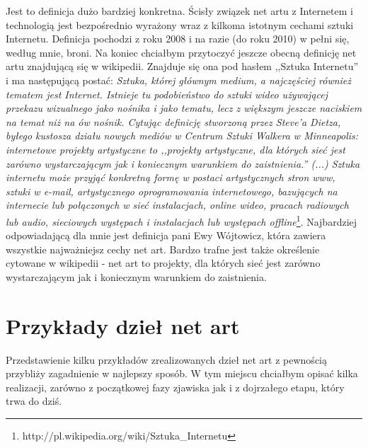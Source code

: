 \documentclass[a4paper,12pt,twoside]{article}
\begin{document}
Jest to definicja dużo bardziej konkretna. Ścisły związek net artu
z Internetem i technologią jest bezpośrednio wyrażony wraz z kilkoma
istotnym cechami sztuki Internetu. Definicja pochodzi z roku 2008
i na razie (do roku 2010) w pełni się, według mnie, broni.
Na koniec chciałbym przytoczyć jeszcze obecną definicję net artu znajdującą
się w wikipedii. Znajduje się ona pod hasłem ,,Sztuka Internetu'' i ma
następującą postać: %
\textit{Sztuka, której głównym
medium, a najczęściej również tematem jest Internet. Istnieje tu podobieństwo
do sztuki wideo używającej przekazu wizualnego jako nośnika i jako tematu,
lecz z większym jeszcze naciskiem na temat niż na ów nośnik. Cytując definicję
stworzoną przez Steve'a Dietza, byłego kustosza działu nowych mediów
w Centrum Sztuki Walkera w Minneapolis: internetowe projekty artystyczne
to ,,projekty artystyczne, dla których sieć jest zarówno wystarczającym
jak i koniecznym warunkiem do zaistnienia.'' (...) Sztuka internetu może
przyjąć konkretną formę w postaci artystycznych stron www, sztuki w e-mail,
artystycznego oprogramowania internetowego, bazujących na internecie lub
połączonych w sieć instalacjach, online wideo, pracach radiowych lub audio,
sieciowych występach i instalacjach lub występach
offline}\footnote{ http://pl.wikipedia.org/wiki/Sztuka\_Internetu}.
Najbardziej odpowiadającą dla mnie jest definicja pani Ewy Wójtowicz,
która zawiera wszystkie najważniejsz cechy net art. Bardzo trafne jest
także określenie cytowane w wikipedii - net art to projekty, dla których
sieć jest zarówno wystarczającym jak i koniecznym warunkiem do zaistnienia.

\section{Przykłady dzieł net art}

Przedstawienie kilku przykładów zrealizowanych dzieł net art z pewnością
przybliży zagadnienie w najlepszy sposób. W tym miejscu chciałbym
opisać kilka realizacji, zarówno z początkowej fazy zjawiska jak
i z dojrzałego etapu, który trwa do dziś.
\end{document}
